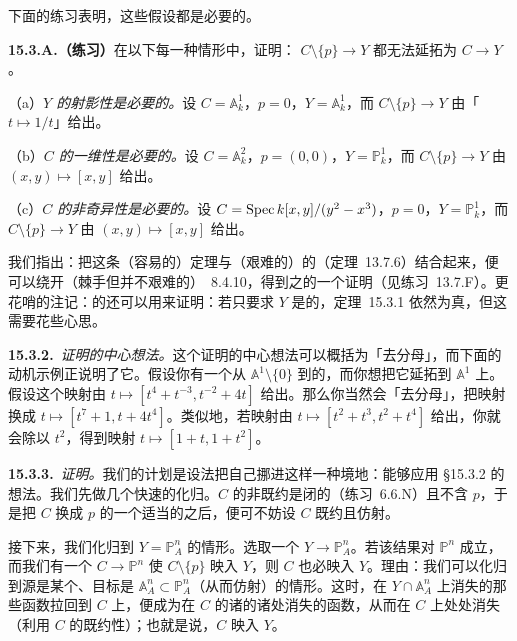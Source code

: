 下面的练习表明，这些假设都是必要的。

\textbf{15.3.A.（练习）}\quad 在以下每一种情形中，证明：\trMorphism{} $C\setminus\{p\}\to Y$ 都无法延拓为\trMorphism{} $C\to Y$。

（a）\emph{$Y$ 的射影性是必要的。}设 $C=\mathbb{A}^1_k$，$p=0$，$Y=\mathbb{A}^1_k$，而 $C\setminus\{p\}\to Y$ 由「$t\mapsto 1/t$」给出。

（b）\emph{$C$ 的一维性是必要的。}设 $C=\mathbb{A}^2_k$，$p=(0,0)$，$Y=\mathbb{P}^1_k$，而 $C\setminus\{p\}\to Y$ 由 $(x,y)\mapsto[x,y]$ 给出。

（c）\emph{$C$ 的非奇异性是必要的。}设 $C=\operatorname{Spec} k[x,y]/(y^2-x^3)$，$p=0$，$Y=\mathbb{P}^1_k$，而 $C\setminus\{p\}\to Y$ 由 $(x,y)\mapsto[x,y]$ 给出。

我们指出：把这条（容易的）定理与（艰难的）\trProperness{}的\trValuativeCriteria（\mbox{定理~13.7.6}）结合起来，便可以绕开（棘手但并不艰难的）\mbox{\trFundamentalTheoremOfEliminationTheory~8.4.10}，得到\trProjectiveSpace{}之\trProperness{}的一个证明（见\mbox{练习~13.7.F}）。更花哨的注记：\trProperness{}的\trValuativeCriteria{}还可以用来证明：若只要求 $Y$ 是\trProper{}的，\mbox{定理~15.3.1} 依然为真，但这需要花些心思。

\textbf{15.3.2.}\ \emph{证明的中心想法。}\quad 这个证明的中心想法可以概括为「去分母」，而下面的动机示例正说明了它。假设你有一个从 $\mathbb{A}^1\setminus\{0\}$ 到\trProjectiveSpace{}的\trMorphism，而你想把它延拓到 $\mathbb{A}^1$ 上。假设这个映射由 $t\mapsto[t^4+t^{-3},t^{-2}+4t]$ 给出。那么你当然会「去分母」，把映射换成 $t\mapsto[t^7+1,t+4t^4]$。类似地，若映射由 $t\mapsto[t^2+t^3,t^2+t^4]$ 给出，你就会除以 $t^2$，得到映射 $t\mapsto[1+t,1+t^2]$。

\textbf{15.3.3.}\ \emph{证明。}\quad 我们的计划是设法把自己挪进这样一种境地：能够应用 \S15.3.2 的想法。我们先做几个快速的化归。$C$ 的非既约\trLocus{}是闭的（\mbox{练习~6.6.N}）且不含 $p$，于是把 $C$ 换成 $p$ 的一个适当的\trOpen\trNeighborhood{}之后，便可不妨设 $C$ 既约且仿射。

接下来，我们化归到 $Y=\mathbb{P}^n_A$ 的情形。选取一个\trClosedEmbedding{} $Y\to\mathbb{P}^n_A$。若该结果对 $\mathbb{P}^n$ 成立，而我们有一个\trMorphism{} $C\to\mathbb{P}^n$ 使 $C\setminus\{p\}$ 映入 $Y$，则 $C$ 也必映入 $Y$。理由：我们可以化归到源是某个\trAffine\trOpenSubset、目标是 $\mathbb{A}^n_A\subset\mathbb{P}^n_A$（从而仿射）的情形。这时，在 $Y\cap\mathbb{A}^n_A$ 上消失的那些函数拉回到 $C$ 上，便成为在 $C$ 的诸\trIrreducibleComponent{}的诸\trGenericPoint{}处消失的函数，从而在 $C$ 上处处消失（利用 $C$ 的既约性）；也就是说，$C$ 映入 $Y$。

